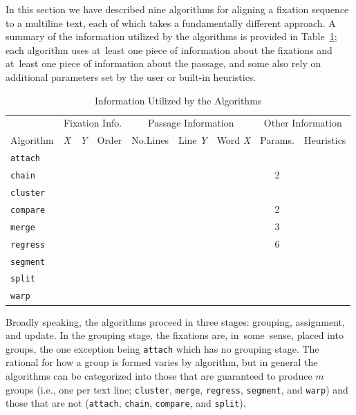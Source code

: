 \documentclass[doc,biblatex]{apa7}
\begin{document}
In this section we have described nine algorithms for aligning a fixation sequence to a multiline text, each of which takes a fundamentally different approach. A summary of the information utilized by the algorithms is provided in Table~\ref{table1}; each algorithm uses at~least one piece of information about the fixations and at~least one piece of information about the passage, and some also rely on additional parameters set by the user or built-in heuristics.

	\begin{table}
	\begin{center}
	\begin{threeparttable}
	\caption{Information Utilized by the Algorithms}
	\begin{tabular}{lcccccccc}
	\hline
	& \multicolumn{3}{c}{Fixation Info.} & \multicolumn{3}{c}{Passage Information} & \multicolumn{2}{c}{Other Information} \\
	Algorithm & \textit{X} & \textit{Y} & Order & No.\@ Lines & Line \textit{Y} & Word \textit{X} & Params. & Heuristics \\ \hline
	\texttt{attach}  & & \checkmark & & & \checkmark & & & \\
	\texttt{chain}   & \checkmark & \checkmark & \checkmark & & \checkmark & & 2 & \\
	\texttt{cluster} & & \checkmark & & \checkmark & & & & \\
	\texttt{compare} & \checkmark & \checkmark & \checkmark & & \checkmark & \checkmark & 2 & \\
	\texttt{merge}   & \checkmark & \checkmark & \checkmark & \checkmark & & & 3 & \checkmark \\
	\texttt{regress} & \checkmark & \checkmark & & \checkmark & \checkmark & & 6 & \\
	\texttt{segment} & \checkmark & & \checkmark & \checkmark & & & & \\
	\texttt{split}   & \checkmark & \checkmark & \checkmark & & \checkmark & & & \\
	\texttt{warp}    & \checkmark & \checkmark & \checkmark & & \checkmark & \checkmark & & \\ \hline
	\end{tabular}
	\label{table1}
	\end{threeparttable}
	\end{center}
	\end{table}

Broadly speaking, the algorithms proceed in three stages: grouping, assignment, and update. In the grouping stage, the fixations are, in~some~sense, placed into groups, the one exception being \texttt{attach} which has no grouping stage. The rational for how a group is formed varies by algorithm, but in general the algorithms can be categorized into those that are guaranteed to produce $m$ groups (i.e., one per text line; \texttt{cluster}, \texttt{merge}, \texttt{regress}, \texttt{segment}, and \texttt{warp}) and those that are not (\texttt{attach}, \texttt{chain}, \texttt{compare}, and \texttt{split}).
\end{document}
